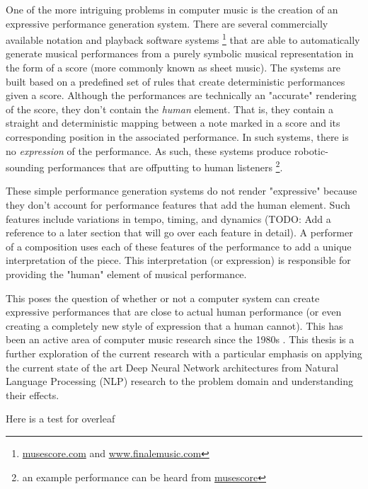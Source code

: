 One of the more intriguing problems in computer music is the creation of an expressive performance generation system. There are several commercially available notation and playback software systems \footnote{\url{musescore.com} and \url{www.finalemusic.com}} that are able to automatically generate musical performances from a purely symbolic musical representation in the form of a score (more commonly known as sheet music). The systems are built based on a predefined set of rules that create deterministic performances given a score. Although the performances are technically an "accurate" rendering of the score, they don't contain the \emph{human} element. That is, they contain a straight and deterministic mapping between a note marked in a score and its corresponding position in the associated performance. In such systems, there is no \emph{expression} of the performance. As such, these systems produce robotic-sounding performances that are offputting to human listeners \footnote{an example performance can be heard from \href{https://musescore.com/user/33884420/scores/6466906}{musescore}}. 

These simple performance generation systems do not render "expressive" because they don't account for performance features that add the human element. Such features include variations in tempo, timing, and dynamics (TODO: Add a reference to a later section that will go over each feature in detail). A performer of a composition uses each of these features of the performance to add a unique interpretation of the piece. This interpretation (or expression) is responsible for providing the "human" element of musical performance. 

This poses the question of whether or not a computer system can create expressive performances that are close to actual human performance (or even creating a completely new style of expression that a human cannot). This has been an active area of computer music research since the 1980s \cite{friberg2006overview}. This thesis is a further exploration of the current research with a particular emphasis on applying the current state of the art Deep Neural Network architectures from Natural Language Processing (NLP) research to the problem domain and understanding their effects. 

Here is a test for overleaf

